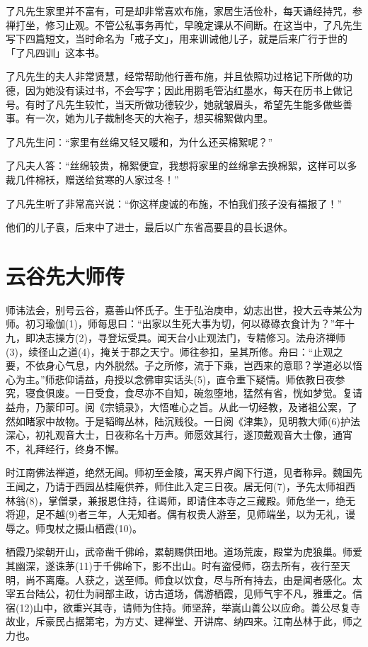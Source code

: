 \documentclass[12pt,twoside,openany]{book}
\begin{document}
了凡先生家里并不富有，可是却非常喜欢布施，家居生活俭朴，每天诵经持咒，参禅打坐，修习止观。不管公私事务再忙，早晚定课从不间断。在这当中，了凡先生写下四篇短文，当时命名为「戒子文」，用来训诫他儿子，就是后来广行于世的「了凡四训」这本书。

了凡先生的夫人非常贤慧，经常帮助他行善布施，并且依照功过格记下所做的功德，因为她没有读过书，不会写字；因此用鹅毛管沾红墨水，每天在历书上做记号。有时了凡先生较忙，当天所做功德较少，她就皱眉头，希望先生能多做些善事。有一次，她为儿子裁制冬天的大袍子，想买棉絮做内里。

了凡先生问：“家里有丝绵又轻又暖和，为什么还买棉絮呢？”

了凡夫人答：“丝绵较贵，棉絮便宜，我想将家里的丝绵拿去换棉絮，这样可以多裁几件棉袄，赠送给贫寒的人家过冬！”

了凡先生听了非常高兴说：“你这样虔诚的布施，不怕我们孩子没有福报了！”

他们的儿子袁，后来中了进士，最后以广东省高要县的县长退休。

\chapter{云谷先大师传}
师讳法会，别号云谷，嘉善山怀氏子。生于弘治庚申，幼志出世，投大云寺某公为师。初习瑜伽(1)，师每思曰：“出家以生死大事为切，何以碌碌衣食计为？”年十九，即决志操方(2)，寻登坛受具。闻天台小止观法门，专精修习。法舟济禅师(3)，续径山之道(4)，掩关于郡之天宁。师往参扣，呈其所修。舟曰：“止观之要，不依身心气息，内外脱然。子之所修，流于下乘，岂西来的意耶？学道必以悟心为主。”师悲仰请益，舟授以念佛审实话头(5)，直令重下疑情。师依教日夜参究，寝食俱废。一日受食，食尽亦不自知，碗忽堕地，猛然有省，恍如梦觉。复请益舟，乃蒙印可。阅《宗镜录》，大悟唯心之旨。从此一切经教，及诸祖公案，了然如睹家中故物。于是韬晦丛林，陆沉贱役。一日阅《津集》，见明教大师(6)护法深心，初礼观音大士，日夜称名十万声。师愿效其行，遂顶戴观音大士像，通宵不，礼拜经行，终身不懈。

时江南佛法禅道，绝然无闻。师初至金陵，寓天界卢阁下行道，见者称异。魏国先王闻之，乃请于西园丛桂庵供养，师住此入定三日夜。居无何(7)，予先太师祖西林翁(8)，掌僧录，兼报恩住持，往谒师，即请住本寺之三藏殿。师危坐一，绝无将迎，足不越(9)者三年，人无知者。偶有权贵人游至，见师端坐，以为无礼，谩辱之。师\xpinyin*曳{杖}之摄山栖霞(10)。

栖霞乃梁朝开山，武帝凿千佛岭，累朝赐供田地。道场荒废，殿堂为虎狼巢。师爱其幽深，遂诛茅(11)于千佛岭下，影不出山。时有盗侵师，窃去所有，夜行至天明，尚不离庵。人获之，送至师。师食以饮食，尽与所有持去，由是闻者感化。太宰五台陆公，初仕为祠部主政，访古道场，偶游栖霞，见师气宇不凡，雅重之。信宿(12)山中，欲重兴其寺，请师为住持。师坚辞，举嵩山善公以应命。善公尽复寺故业，斥豪民占据第宅，为方丈、建禅堂、开讲席、纳四来。江南丛林于此，师之力也。
\end{document}
